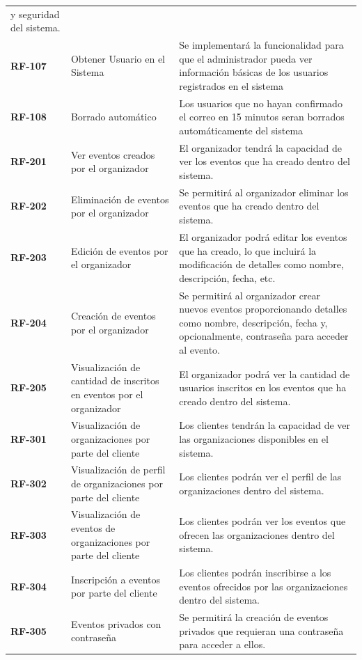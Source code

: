 \begin{longtable}{ p{2.5cm} p{4cm} p{9cm}  }
    y seguridad del sistema.\\
    \textbf{RF-107} & Obtener Usuario en el Sistema & Se implementará la funcionalidad para que el administrador pueda 
    ver información básicas de los usuarios registrados en el sistema\\
    \textbf{RF-108} & Borrado automático & Los usuarios que no hayan confirmado el correo en 15 minutos seran borrados automáticamente del sistema\\
    \textbf{RF-201} & Ver eventos creados por el organizador & El organizador tendrá la capacidad de ver los eventos que ha creado dentro del sistema.\\
    \textbf{RF-202} & Eliminación de eventos por el organizador & Se permitirá al organizador eliminar los eventos que ha creado dentro del sistema.\\
    \textbf{RF-203} & Edición de eventos por el organizador & El organizador podrá editar los eventos que ha creado, lo que incluirá la modificación de 
    detalles como nombre, descripción, fecha, etc.\\
    \textbf{RF-204} & Creación de eventos por el organizador & Se permitirá al organizador crear nuevos eventos proporcionando detalles como nombre, descripción, 
    fecha y, opcionalmente, contraseña para acceder al evento.\\
    \textbf{RF-205} & Visualización de cantidad de inscritos en eventos por el organizador & El organizador podrá ver la cantidad de usuarios inscritos en los 
    eventos que ha creado dentro del sistema.\\
    \textbf{RF-301} & Visualización de organizaciones por parte del cliente & Los clientes tendrán la capacidad de ver las organizaciones disponibles en el sistema.\\
    \textbf{RF-302} & Visualización de perfil de organizaciones por parte del cliente & Los clientes podrán ver el perfil de las organizaciones dentro del sistema.\\
    \textbf{RF-303} & Visualización de eventos de organizaciones por parte del cliente & Los clientes podrán ver los eventos que ofrecen las organizaciones dentro del sistema.\\
    \textbf{RF-304} & Inscripción a eventos por parte del cliente & Los clientes podrán inscribirse a los eventos ofrecidos por las organizaciones dentro del sistema.\\
    \textbf{RF-305} & Eventos privados con contraseña & Se permitirá la creación de eventos privados que requieran una contraseña para acceder a ellos.\\

\end{longtable}
